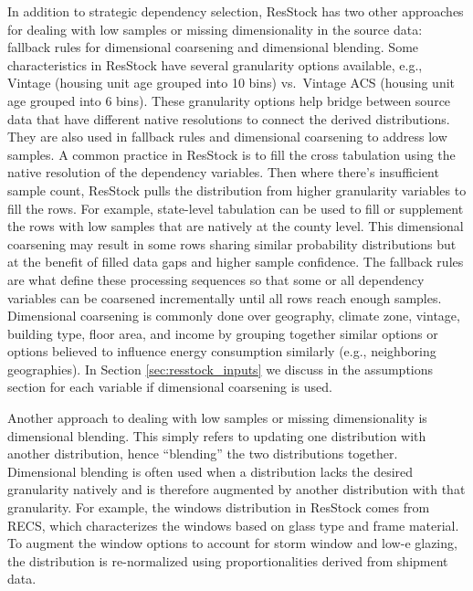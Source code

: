 In addition to strategic dependency selection, ResStock has two other approaches for dealing with low samples or missing dimensionality in the source data: fallback rules for dimensional coarsening and dimensional blending. Some characteristics in ResStock have several granularity options available, e.g., Vintage (housing unit age grouped into 10 bins) vs.~Vintage ACS (housing unit age grouped into 6 bins). These granularity options help bridge between source data that have different native resolutions to connect the derived distributions. They are also used in fallback rules and dimensional coarsening to address low samples. A common practice in ResStock is to fill the cross tabulation using the native resolution of the dependency variables. Then where there’s insufficient sample count, ResStock pulls the distribution from higher granularity variables to fill the rows. For example, state-level tabulation can be used to fill or supplement the rows with low samples that are natively at the county level. This dimensional coarsening may result in some rows sharing similar probability distributions but at the benefit of filled data gaps and higher sample confidence. The fallback rules are what define these processing sequences so that some or all dependency variables can be coarsened incrementally until all rows reach enough samples. Dimensional coarsening is commonly done over geography, climate zone, vintage, building type, floor area, and income by grouping together similar options or options believed to influence energy consumption similarly (e.g., neighboring geographies). In Section \ref{sec:resstock_inputs} we discuss in the assumptions section for each variable if dimensional coarsening is used.

Another approach to dealing with low samples or missing dimensionality is dimensional blending. This simply refers to updating one distribution with another distribution, hence “blending” the two distributions together. Dimensional blending is often used when a distribution lacks the desired granularity natively and is therefore augmented by another distribution with that granularity. For example, the windows distribution in ResStock comes from RECS, which characterizes the windows based on glass type and frame material. To augment the window options to account for storm window and low-e glazing, the distribution is re-normalized using proportionalities derived from shipment data.

